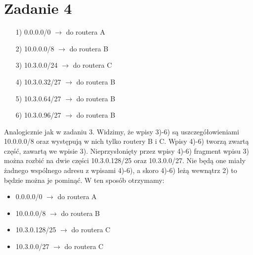 \documentclass[11pt,wide]{article}
\begin{document}
\section{Zadanie 4}
\begin{itemize}
\item[1)] 0.0.0.0/0 $\rightarrow$ do routera A
\item[2)] 10.0.0.0/8 $\rightarrow$ do routera B
\item[3)] 10.3.0.0/24 $\rightarrow$ do routera C
\item[4)] 10.3.0.32/27 $\rightarrow$ do routera B
\item[5)] 10.3.0.64/27 $\rightarrow$ do routera B
\item[6)] 10.3.0.96/27 $\rightarrow$ do routera B
\end{itemize}
Analogicznie jak w zadaniu 3. Widzimy, że wpisy 3)-6) są uszczegółowieniami 10.0.0.0/8 oraz występują w nich tylko routery B i C. Wpisy 4)-6) tworzą zwartą część, zawartą we wpisie 3). Nieprzysłonięty przez wpisy 4)-6) fragment wpisu 3) można rozbić na dwie części 10.3.0.128/25 oraz 10.3.0.0/27. Nie będą one miały żadnego wspólnego adresu z wpisami 4)-6), a skoro 4)-6) leżą wewnątrz 2) to będzie można je pominąć. W ten sposób otrzymamy:
\begin{itemize}
\item 0.0.0.0/0 $\rightarrow$ do routera A
\item 10.0.0.0/8 $\rightarrow$ do routera B
\item 10.3.0.128/25 $\rightarrow$ do routera C
\item 10.3.0.0/27 $\rightarrow$ do routera C
\end{itemize}
\end{document}
